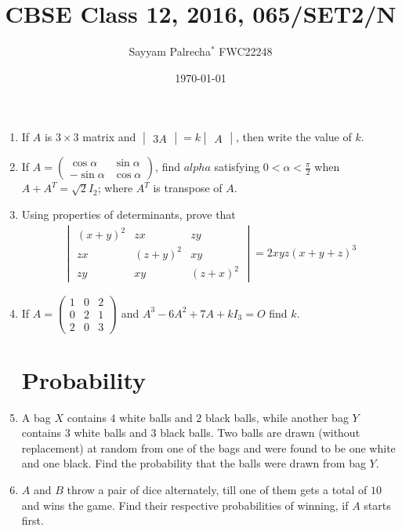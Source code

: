\documentclass[10pt,-letter paper]{article}
\providecommand{\brak}[1]{\ensuremath{\left(#1\right)}}
\newcommand{\myvec}[1]{\ensuremath{\begin{pmatrix}#1\end{pmatrix}}}
\newcommand{\mydet}[1]{\ensuremath{\begin{vmatrix}#1\end{vmatrix}}}
\begin{document}
\author{Sayyam Palrecha$^{*}$ FWC22248}
\title{CBSE Class 12, 2016, 065/SET2/N}
\date{\today}

\maketitle

\bigskip

\begin{enumerate}

\section{Matrices}

\item If $A$ is $3\times 3$ matrix and $\mydet{3A} = k\mydet{A}$, then write the value of $k$.

\item If $A = \myvec{\cos{\alpha} & \sin{\alpha}\\ -\sin{\alpha} & \cos{\alpha}}$, find $alpha$ satisfying $0 < \alpha < \frac{\pi}{2}$ when $A + A^T = \sqrt{2}I_2$; where $A^T$ is transpose of $A$.

\item Using properties of determinants, prove that
\begin{align*}
	\mydet{\brak{x+y}^2 & zx & zy \\
	zx & \brak{z+y}^2 & xy \\ zy & xy & \brak{z+x}^2} = 2xyz\brak{x+y+z}^3
\end{align*}

\item If $A = \myvec{1 & 0 & 2 \\ 0 & 2 & 1 \\ 2 & 0 & 3}$ and $A^3 - 6A^2 + 7A + kI_3 = O$ find $k$.

\section{Probability}

\item A bag $X$ contains $4$ white balls and $2$ black balls, while another bag $Y$ contains $3$ white balls and $3$ black balls. Two balls are drawn (without replacement) at random from one of the bags and were found to be one white and one black. Find the probability that the balls were drawn from bag $Y$.

\item $A$ and $B$ throw a pair of dice alternately, till one of them gets a total of $10$ and wins the game. Find their respective probabilities of winning, if $A$ starts first.


\end{enumerate}
\end{document}
